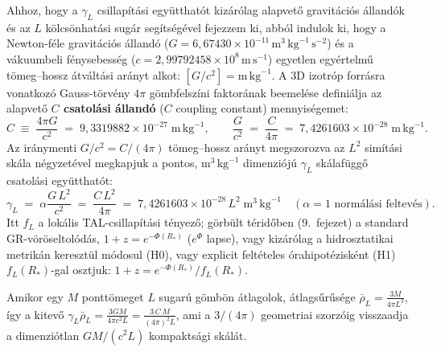 \documentclass[10pt,a4paper]{article}
\begin{document}
\par
Ahhoz, hogy a $\gamma_L$ csillap\'it\'asi egy\"utthat\'ot kiz\'ar\'olag alapvet\H{o} gravit\'aci\'os \'alland\'ok \'es az $L$ k\"olcs\"onhat\'asi sug\'ar seg\'its\'eg\'evel fejezzem ki, abb\'ol indulok ki, hogy a Newton-f\'ele gravit\'aci\'os \'alland\'o ($G = 6{,}67430\times 10^{-11}\,\text{m}^3\,\text{kg}^{-1}\,\text{s}^{-2}$) \'es a v\'akuumbeli f\'enysebess\'eg ($c = 2{,}99792458\times 10^{8}\,\text{m}\,\text{s}^{-1}$) egyetlen egy\'ertelm\H{u} t\"omeg--hossz \'atvált\'asi ar\'anyt alkot: $[G/c^2] = \text{m}\,\text{kg}^{-1}$. A 3D izotr\'op forr\'asra vonatkoz\'o Gauss-t\"orv\'eny $4\pi$ g\"ombfelsz\'ini faktor\'anak beemel\'ese defini\'alja az alapvet\H{o} \textbf{$C$ csatol\'asi \'alland\'o} ($C$ coupling constant) mennyis\'egemet:
\begin{equation}
  C \;\equiv\; \frac{4\pi G}{c^2} \;=\; 9{,}3319882\times 10^{-27}\;\text{m}\,\text{kg}^{-1}, \qquad
  \frac{G}{c^2} \;=\; \frac{C}{4\pi} \;=\; 7{,}4261603\times 10^{-28}\;\text{m}\,\text{kg}^{-1}.
\end{equation}
Az ir\'anymenti $G/c^2 = C/(4\pi)$ t\"omeg--hossz ar\'anyt megszorozva az $L^2$ sim\'it\'asi sk\'ala n\'egyzet\'evel megkapjuk a pontos, $\text{m}^3\,\text{kg}^{-1}$ dimenzi\'oj\'u $\gamma_L$ sk\'alaf\"ugg\H{o} csatol\'asi egy\"utthat\'ot:
\begin{equation}
  \gamma_L \;=\; \alpha\frac{G\,L^2}{c^2} \;=\; \frac{C\,L^2}{4\pi} \;=\; 7{,}4261603\times 10^{-28}\,L^2\;\text{m}^3\,\text{kg}^{-1}\quad(\alpha=1\text{ norm\'al\'asi feltev\'es}).
\end{equation}
Itt $f_L$ a lok\'alis TAL-csillap\'it\'asi t\'enyez\H{o}; g\"orb\"ult t\'erid\H{o}ben (9.\ fejezet) a standard GR-v\"or\"oseltol\'od\'as, $1+z = e^{-\Phi(R_*)}$ ($e^{\Phi}$ lapse), vagy kiz\'ar\'olag a hidrosztatikai metrik\'an kereszt\"ul m\'odosul (H0), vagy explicit felt\'eteles \'orahipot\'ezisk\'ent (H1) $f_L(R_*)$-gal osztjuk: $1+z = e^{-\Phi(R_*)}/f_L(R_*)$.

Amikor egy $M$ pontt\"omeget $L$ sugar\'u g\"omb\"on \'atlagolok, \'atlags\H{u}r\H{u}s\'ege $\bar{\rho}_L = \frac{3M}{4\pi L^3}$, \'igy a kitev\H{o} $\gamma_L \bar{\rho}_L = \frac{3GM}{4\pi c^2 L} = \frac{3\,C\,M}{(4\pi)^2 L}$, ami a $3/(4\pi)$ geometriai szorz\'oig visszaadja a dimenzi\'otlan $GM/(c^2 L)$ kompakts\'agi sk\'al\'at.
\end{document}
